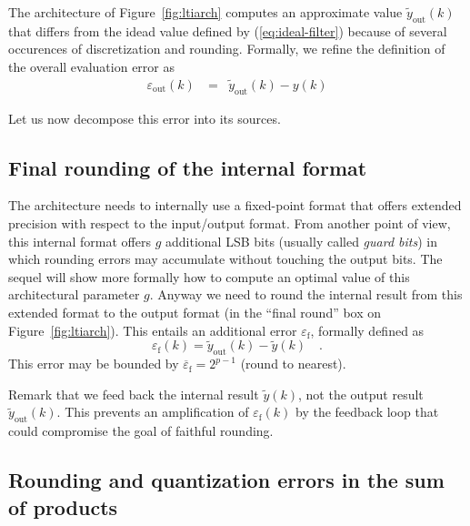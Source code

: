 \documentclass[twocolumn]{IEEEtran}
\newcommand{\abserr}{\varepsilon}
\newcommand{\maxerr}{\bound{\abserr}}
\newcommand{\appr}[1]{\widetilde{#1}}
\newcommand{\yout}{\widetilde{y}_{\text{out}}}
\newcommand{\epstotal}{\abserr_{\text{out}}}
\newcommand{\epsfinalround}{\abserr_{\text{f}}}
\newcommand{\maxepsfinalround}{\maxerr_{\text{f}}}
\newcommand{\bound}[1]{\overline{#1}}
\begin{document}
\begin{figure*}
\begin{tikzpicture}
  \end{tikzpicture}

\caption{Abstract architecture for the direct form realization of an LTI filter \label{fig:ltiarch}}
\end{figure*}



The architecture of Figure~\ref{fig:ltiarch} computes an approximate value $\yout(k)$ that differs from  the idead value defined by  (\ref{eq:ideal-filter}) because of several occurences of discretization and rounding.
Formally, we refine the definition of the overall evaluation error as 
\begin{eqnarray}
  \epstotal(k)\ &= & \yout(k) - y(k)\label{eq:ltierr0}
\end{eqnarray}

Let us now decompose this error into its sources.


\subsection{Final rounding of the internal format} 

The architecture needs to internally use a fixed-point format that offers extended precision with respect to the input/output format.
From another point of view, this internal format offers $g$ additional LSB bits (usually called \emph{guard bits}) in which rounding errors may accumulate without touching the output bits. 
The sequel will show more formally how to compute an optimal value of this architectural parameter $g$. 
Anyway we need to round the internal result from this extended format to the output format (in the ``final round'' box on Figure~\ref{fig:ltiarch}). 
This entails an additional error $\epsfinalround$, formally defined as 
\begin{equation}
  \label{eq:epsfinalround}
  \epsfinalround(k) = \yout(k) - \appr{y}(k)\quad.
\end{equation}
This error may be bounded by  $\maxepsfinalround = 2^{p-1}$ (round to nearest). 

Remark that we feed back the internal result $\appr{y}(k)$, not the output result $\yout(k)$. 
This  prevents an amplification of $\epsfinalround(k)$ by the feedback loop that could compromise the goal of faithful rounding. 

\subsection{Rounding and quantization errors in the sum of products} 
\end{document}
